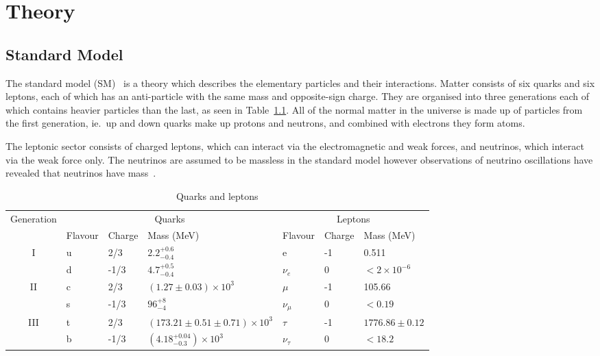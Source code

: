 \chapter{Theory}
\label{c:theory}

\section{Standard Model}

The standard model (SM)~\cite{Glashow:1961tr,Salam:1968rm,PhysRevLett.19.1264,DGriff} is a theory which describes the elementary particles and their interactions. Matter consists of six quarks and six leptons, each of which has an anti-particle with the same mass and opposite-sign charge. They are organised into three generations each of which contains heavier particles than the last, as seen in Table~\ref{table:SMmatter}. All of the normal matter in the universe is made up of particles from the first generation, ie.~up and down quarks make up protons and neutrons, and combined with electrons they form atoms. 

The leptonic sector consists of charged leptons, which can interact via the electromagnetic and weak forces, and neutrinos, which interact via the weak force only. The neutrinos are assumed to be massless in the standard model however observations of neutrino oscillations have revealed that neutrinos have mass~\cite{PhysRevC.88.025501}.

\vspace{0.8cm}
\begin{table}[ht!]
\centering
\caption{Quarks and leptons}
\label{table:SMmatter}
\footnotesize
\begin{tabular}{|c|l|l|l|l|l|l|}
\hline
\multirow{2}{*}{Generation} & \multicolumn{3}{c|}{Quarks}                             & \multicolumn{3}{c|}{Leptons}              \\ \cline{2-7} 
                            & Flavour & Charge & Mass (MeV)                           & Flavour      & Charge & Mass (MeV)        \\ \hline
\hline

\multirow{2}{*}{I}          & u       & 2/3    & $2.2^{+0.6}_{-0.4}$                  & e            & -1     & 0.511             \\
                            & d       & -1/3   & $4.7^{+0.5}_{-0.4}$                  & $\nu_{e}$    & 0      & $<2\times10^{-6}$ \\ \hline
\multirow{2}{*}{II}         & c       & 2/3    & $(1.27\pm 0.03)\times10^{3}$         & $\mu$        & -1     & 105.66            \\
                            & s       & -1/3   & $96^{+8}_{-4}$                       & $\nu_{\mu}$  & 0      & $<0.19$           \\ \hline
\multirow{2}{*}{III}        & t       & 2/3    & $(173.21\pm0.51\pm0.71)\times10^{3}$ & $\tau$       & -1     & $1776.86\pm0.12$  \\
                            & b       & -1/3   & $(4.18^{+0.04}_{-0.3})\times10^{3}$  & $\nu_{\tau}$ & 0      & $<18.2$           \\ \hline
\end{tabular}
\end{table}

